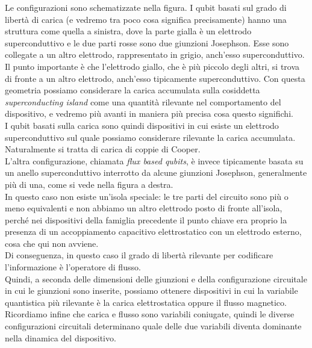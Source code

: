 Le configurazioni sono schematizzate nella figura. I qubit basati sul grado di libertà di carica (e vedremo tra poco cosa significa precisamente) hanno una struttura come quella a sinistra, dove la parte gialla è un elettrodo superconduttivo e le due parti rosse sono due giunzioni Josephson. Esse sono collegate a un altro elettrodo, rappresentato in grigio, anch'esso superconduttivo.\\
Il punto importante è che l'elettrodo giallo, che è più piccolo degli altri, si trova di fronte a un altro elettrodo, anch'esso tipicamente superconduttivo. Con questa geometria possiamo considerare la carica accumulata sulla cosiddetta \emph{superconducting island} come una quantità rilevante nel comportamento del dispositivo, e vedremo più avanti in maniera più precisa cosa questo significhi.\\
I qubit basati sulla carica sono quindi dispositivi in cui esiste un elettrodo superconduttivo sul quale possiamo considerare rilevante la carica accumulata. Naturalmente si tratta di carica di coppie di Cooper.\\
L'altra configurazione, chiamata \emph{flux based qubits}, è invece tipicamente basata su un anello superconduttivo interrotto da alcune giunzioni Josephson, generalmente più di una, come si vede nella figura a destra.\\
In questo caso non esiste un'isola speciale: le tre parti del circuito sono più o meno equivalenti e non abbiamo un altro elettrodo posto di fronte all'isola, perché nei dispositivi della famiglia precedente il punto chiave era proprio la presenza di un accoppiamento capacitivo elettrostatico con un elettrodo esterno, cosa che qui non avviene.\\
Di conseguenza, in questo caso il grado di libertà rilevante per codificare l'informazione è l'operatore di flusso.\\
Quindi, a seconda delle dimensioni delle giunzioni e della configurazione circuitale in cui le giunzioni sono inserite, possiamo ottenere dispositivi in cui la variabile quantistica più rilevante è la carica elettrostatica oppure il flusso magnetico.\\
Ricordiamo infine che carica e flusso sono variabili coniugate, quindi le diverse configurazioni circuitali determinano quale delle due variabili diventa dominante nella dinamica del dispositivo.
